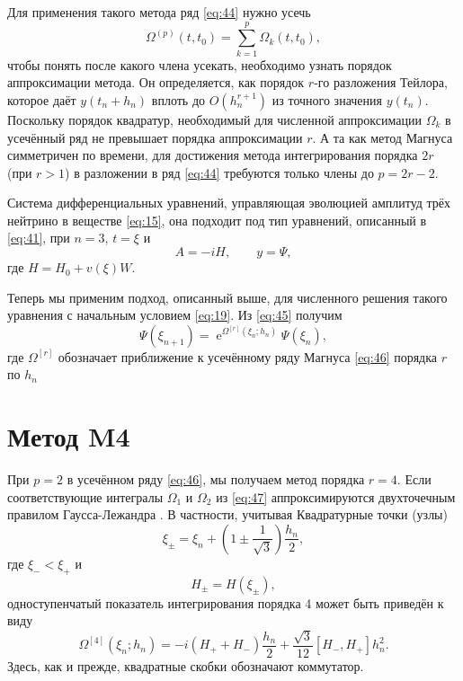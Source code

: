 \documentclass[a4paper,12pt]{article}
\renewcommand{\exp}{\operatorname{e}}
\begin{document}
	Для применения такого метода ряд \eqref{eq:44} нужно усечь
	\begin{equation}\label{eq:46}
		\Omega^{(p)}(t,t_0)=\sum_{k=1}^{p}\Omega_{k}(t,t_0),
	\end{equation}
	чтобы понять после какого члена усекать, необходимо узнать порядок аппроксимации метода. Он определяется, как порядок \(r\)-го разложения Тейлора, которое даёт \(y(t_{n}+h_n)\) вплоть до \(O(h_n^{r+1})\) из точного значения \(y(t_{n})\). Поскольку порядок квадратур, необходимый для численной аппроксимации \(\Omega_{k}\) в усечённый ряд не превышает порядка аппроксимации \(r\). А та как метод Магнуса симметричен по времени, для достижения метода интегрирования порядка \(2r\) (при \( r > 1\)) в разложении в ряд \eqref{eq:44} требуются только члены до \(p = 2r - 2\).

	Система дифференциальных уравнений, управляющая эволюцией амплитуд трёх нейтрино в веществе \eqref{eq:15}, она подходит под тип уравнений, описанный в \eqref{eq:41}, при \(n=3\), \(t=\xi\) и
	\begin{equation}
		A=-iH,\qquad y=\Psi,
	\end{equation}
	где \(H=H_{0}+ v(\xi)W\).

	Теперь мы применим подход, описанный выше, для численного решения такого уравнения с начальным условием \eqref{eq:19}. Из \eqref{eq:45} получим
	\begin{equation}
		\Psi(\xi_{n+1})=\exp^{\Omega^{[r]}(\xi_n;h_n)}\Psi(\xi_n),
	\end{equation}
	где \(\Omega^{[r]}\) обозначает приближение к усечённому ряду Магнуса \eqref{eq:46} порядка \(r\) по \(h_n\)

\newpage
\section{Метод M4}

	При \(p = 2\) в усечённом ряду \eqref{eq:46}, мы получаем метод порядка \(r = 4\). Если соответствующие интегралы \(\Omega_{1}\) и \(\Omega_{2}\) из \eqref{eq:47} аппроксимируются двухточечным правилом Гаусса-Лежандра \cite{68}. В частности, учитывая Квадратурные точки (узлы)
	\begin{equation}
		\xi_{\pm} = \xi_{n} + (1 \pm \frac{1}{\sqrt{3}})\frac{h_n}{2},
	\end{equation}
	где \(\xi_{-}<\xi_{+}\) и
	\begin{equation}
		H_{\pm} = H(\xi_{\pm}),
	\end{equation}
	одноступенчатый показатель интегрирования порядка 4 может быть приведён к виду
	\begin{equation}\label{eq:49}
		\Omega^{[4]}(\xi_n;h_n)=-i(H_+ + H_-)\frac{h_n}{2} +
\frac{\sqrt{3}}{12}[H_-, H_+]h_n^2.
	\end{equation}
	Здесь, как и прежде, квадратные скобки обозначают коммутатор.
\end{document}
